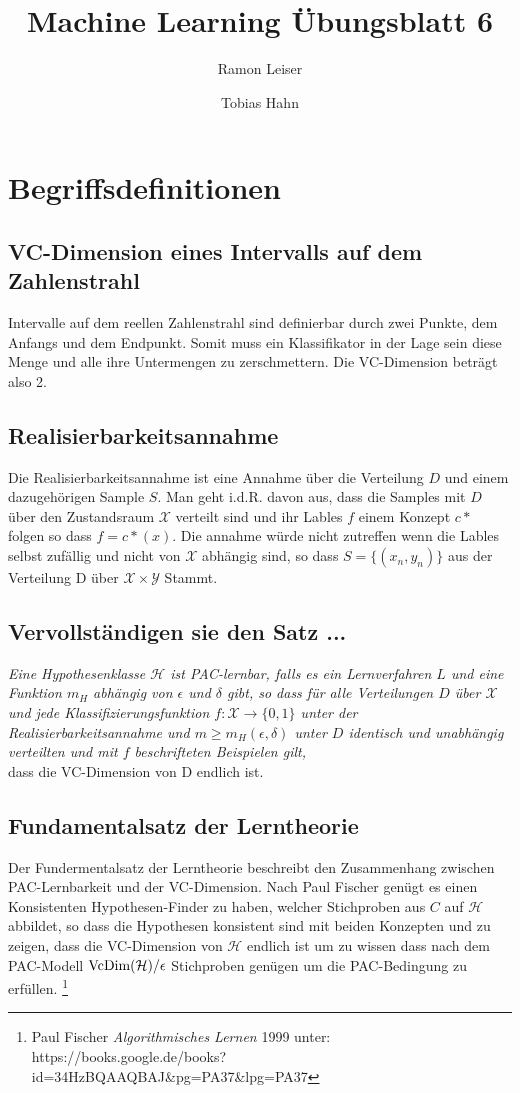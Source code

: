 \documentclass[a4paper]{article}
\title{Machine Learning Übungsblatt 6}
\author{Ramon Leiser\and Tobias Hahn}
\begin{document}
\maketitle
\newpage
 \section{Begriffsdefinitionen}
 
\subsection{VC-Dimension eines Intervalls auf dem Zahlenstrahl}
Intervalle auf dem reellen Zahlenstrahl sind definierbar durch zwei Punkte, dem Anfangs und dem Endpunkt. Somit muss ein Klassifikator in der Lage sein diese Menge und alle ihre Untermengen zu zerschmettern. Die VC-Dimension beträgt also 2.

\subsection{Realisierbarkeitsannahme}
Die Realisierbarkeitsannahme ist eine Annahme über die Verteilung  $D$ und einem dazugehörigen Sample $S$. Man geht i.d.R. davon aus, dass die Samples mit $D$ über den Zustandsraum $\mathcal{X}$ verteilt sind und ihr Lables $f$ einem Konzept $c*$ folgen so dass $f=c*(x)$. Die annahme würde nicht zutreffen wenn die Lables selbst zufällig und nicht von $\mathcal{X}$ abhängig sind, so dass $ S= \{ ( x_n,y_n ) \}$ aus der Verteilung D über $\mathcal{X} \times \mathcal{Y} $ Stammt.

\subsection{Vervollständigen sie den Satz ...}
\textit{Eine Hypothesenklasse $\mathcal{H}$  ist PAC-lernbar, falls es ein Lernverfahren $L$ und eine Funktion $m_H$ abhängig von $\epsilon$ und $\delta$ gibt, so dass für alle Verteilungen $D$ über $\mathcal{X}$ und jede Klassifizierungsfunktion $f : \mathcal{X} \rightarrow \{0, 1\}$ unter der Realisierbarkeitsannahme und $ m \geq m_H(\epsilon, \delta) $ unter $D$ identisch und unabhängig verteilten und mit $f$ beschrifteten Beispielen gilt, }\\
dass die VC-Dimension von D endlich ist.


\subsection{Fundamentalsatz der Lerntheorie}
Der Fundermentalsatz der Lerntheorie beschreibt den Zusammenhang zwischen PAC-Lernbarkeit und der VC-Dimension. Nach Paul Fischer genügt es einen Konsistenten Hypothesen-Finder zu haben, welcher Stichproben aus $C$ auf $\mathcal{H}$ abbildet, so dass die Hypothesen konsistent sind mit beiden Konzepten und zu zeigen, dass die VC-Dimension von $\mathcal{H}$ endlich ist um zu wissen dass nach dem PAC-Modell $\textnormal{VcDim}(\mathcal{H})/\epsilon$ Stichproben genügen um die PAC-Bedingung zu erfüllen. \footnote{Paul Fischer \textit{Algorithmisches Lernen} 1999 unter: https://books.google.de/books?id=34HzBQAAQBAJ\&pg=PA37\&lpg=PA37
}
\end{document}
